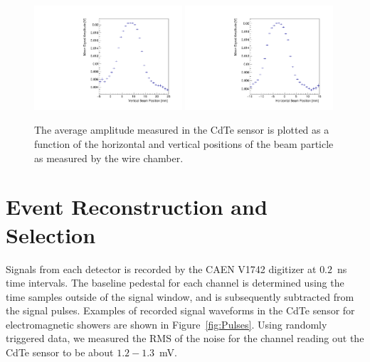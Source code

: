 \documentclass[preprint,1p]{elsarticle}
\begin{document}
\begin{figure}[htbp] 
\centering
\includegraphics[width=0.49\textwidth]{figures/SensorXProfile.pdf} 
\includegraphics[width=0.49\textwidth]{figures/SensorYProfile.pdf} 
\caption{The average amplitude measured in the CdTe sensor is plotted as a function of 
the horizontal and vertical positions of the beam particle as measured by the wire chamber.} 
\label{fig:BeamSensorPosition} 
\end{figure} 


\section{Event Reconstruction and Selection }
\label{sec:reco}

Signals from each detector is recorded by the CAEN V1742 digitizer at $0.2$~ns time intervals.
The baseline pedestal for each channel is determined using the time samples outside of
the signal window, and is subsequently subtracted from the signal pulses. Examples of recorded
signal waveforms in the CdTe sensor for electromagnetic showers are shown in Figure~\ref{fig:Pulses}.
Using randomly triggered data, we measured the RMS of the noise for the channel reading out 
the CdTe sensor to be about $1.2-1.3$~mV. 
\end{document}
